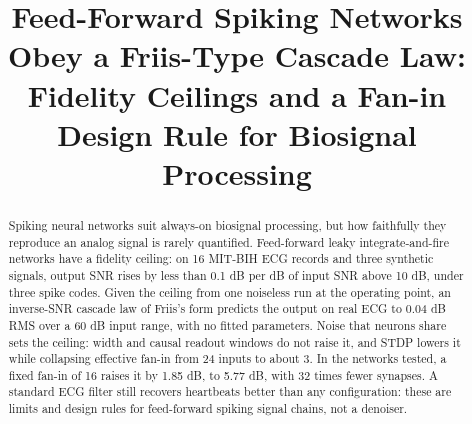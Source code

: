 \documentclass[conference]{IEEEtran}
\begin{document}

\title{Feed-Forward Spiking Networks Obey a Friis-Type Cascade Law: Fidelity
Ceilings and a Fan-in Design Rule for Biosignal Processing}

\author{
\and
{}
\and
{}
}

\maketitle

\begin{abstract}
Spiking neural networks suit always-on biosignal processing, but how
faithfully they reproduce an analog signal is rarely quantified. Feed-forward
leaky integrate-and-fire networks have a fidelity ceiling: on 16 MIT-BIH ECG
records and three synthetic signals, output SNR rises by less than 0.1 dB per
dB of input SNR above 10 dB, under three spike codes. Given the ceiling from
one noiseless run at the operating point, an inverse-SNR cascade law of
Friis's form predicts the output on real ECG to 0.04 dB RMS over a 60 dB input
range, with no fitted parameters. Noise that neurons share sets the ceiling:
width and causal readout windows do not raise it, and STDP lowers it while
collapsing effective fan-in from 24 inputs to about 3. In the networks tested,
a fixed fan-in of 16 raises it by 1.85 dB, to 5.77 dB, with 32 times fewer
synapses. A standard ECG filter still recovers heartbeats better than any
configuration: these are limits and design rules for feed-forward spiking
signal chains, not a denoiser.
\end{abstract}
\end{document}
